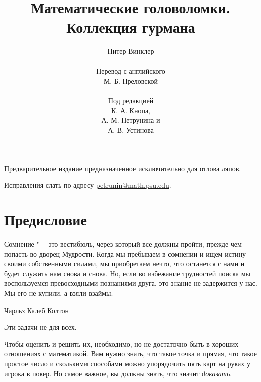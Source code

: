 \documentclass[twoside]{book}
\begin{document}

\title{Математические головоломки.\\
Коллекция гурмана}
\author{Питер Винклер\\
\\
Перевод с английского 
\\
М. Б. Преловской
\\
\\
Под редакцией
\\
К. А. Кнопа,\\
А. М. Петрунина и\\
А. В. Устинова
}
\date{}
\maketitle

\thispagestyle{empty}

Предварительное издание предназначенное исключительно для отлова ляпов. 

Исправления слать по адресу 
\url{petrunin@math.psu.edu}.


\vfill


\newcommand{\kk}[1]{\begingroup\color{brown}KK:~#1\endgroup}
\newcommand{\au}[1]{\begingroup\color{brown}AU:~#1\endgroup}




\chapter{Предисловие}

\setlength{\epigraphwidth}{.8\textwidth} %
\epigraph{Сомнение "--- это вестибюль, через который все должны пройти, прежде чем попасть во дворец Мудрости.
Когда мы пребываем в сомнении и ищем истину своими собственными силами, мы приобретаем нечто, что останется с нами и будет служить нам снова и снова.
Но, если во избежание трудностей поиска мы воспользуемся превосходными познаниями друга, это знание не задержится у нас.
Мы его не купили, а взяли взаймы.}{Чарльз Калеб Колтон}
                                                                                     

Эти задачи не для всех.

Чтобы оценить и решить их, необходимо, но не достаточно быть в хороших отношениях с математикой.
Вам нужно знать, что такое точка и прямая, что такое простое число и сколькими способами можно упорядочить пять карт на руках у игрока в покер.
Но самое важное, вы должны знать, что значит \emph{доказать}.
\end{document}
